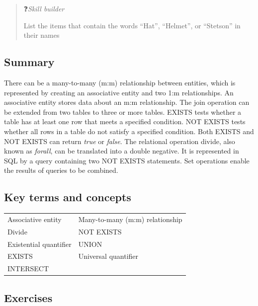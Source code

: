 \documentclass[
]{article}
\begin{document}
\begin{quote}
❓\emph{Skill builder}

List the items that contain the words ``Hat'', ``Helmet'', or ``Stetson'' in their names
\end{quote}

\hypertarget{summary-4}{%
\subsection*{Summary}\label{summary-4}}

There can be a many-to-many (m:m) relationship between entities, which is represented by creating an associative entity and two 1:m relationships. An associative entity stores data about an m:m relationship. The join operation can be extended from two tables to three or more tables. EXISTS tests whether a table has at least one row that meets a specified condition. NOT EXISTS tests whether all rows in a table do not satisfy a specified condition. Both EXISTS and NOT EXISTS can return \emph{true} or \emph{false}. The relational operation divide, also known as \emph{forall}, can be translated into a double negative. It is represented in SQL by a query containing two NOT EXISTS statements. Set operations enable the results of queries to be combined.

\hypertarget{key-terms-and-concepts-2}{%
\subsection*{Key terms and concepts}\label{key-terms-and-concepts-2}}

\begin{longtable}[]{@{}ll@{}}
\toprule
& \\
\midrule
\endhead
Associative entity & Many-to-many (m:m) relationship \\
Divide & NOT EXISTS \\
Existential quantifier & UNION \\
EXISTS & Universal quantifier \\
INTERSECT & \\
\bottomrule
\end{longtable}

\hypertarget{exercises-4}{%
\subsection*{Exercises}\label{exercises-4}}
\end{document}
